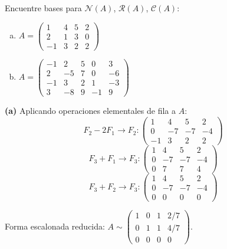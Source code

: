 \begin{prob} Encuentre bases para $\mathcal{N}(A)$, $\mathcal{R}(A)$, $\mathcal{C}(A)$:
\begin{enumerate}[(a)]
\item $A = \begin{pmatrix} 1 & 4 & 5 & 2 \\ 2 & 1 & 3 & 0 \\ -1 & 3 & 2 & 2 \end{pmatrix}$
\item $A = \begin{pmatrix} -1 & 2 & 5 & 0 & 3 \\ 2 & -5 & 7 & 0 & -6 \\ -1 & 3 & 2 & 1 & -3 \\ 3 & -8 & 9 & -1 & 9 \end{pmatrix}$
\end{enumerate}

\begin{myproof}
\textbf{(a)} Aplicando operaciones elementales de fila a $A$:
$$F_2 - 2F_1 \to F_2: \begin{pmatrix} 1 & 4 & 5 & 2 \\ 0 & -7 & -7 & -4 \\ -1 & 3 & 2 & 2 \end{pmatrix}$$
$$F_3 + F_1 \to F_3: \begin{pmatrix} 1 & 4 & 5 & 2 \\ 0 & -7 & -7 & -4 \\ 0 & 7 & 7 & 4 \end{pmatrix}$$
$$F_3 + F_2 \to F_3: \begin{pmatrix} 1 & 4 & 5 & 2 \\ 0 & -7 & -7 & -4 \\ 0 & 0 & 0 & 0 \end{pmatrix}$$

Forma escalonada reducida: $A \sim \begin{pmatrix} 1 & 0 & 1 & 2/7 \\ 0 & 1 & 1 & 4/7 \\ 0 & 0 & 0 & 0 \end{pmatrix}.$


\end{myproof}
\end{prob}
